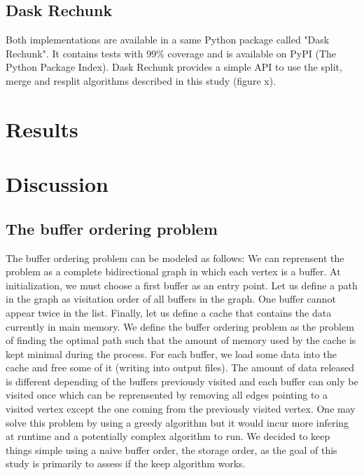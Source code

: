 \documentclass[conference]{IEEEtran}
\begin{document}
\subsection{Dask Rechunk}

Both implementations are available in a same Python package called "Dask Rechunk". It
contains tests with 99\% coverage and is available on PyPI (The Python Package
Index). Dask Rechunk provides a simple API to use the split, merge and resplit
algorithms described in this study (figure x).

\section{Results}

\section{Discussion}

\subsection{The buffer ordering problem}
The buffer ordering problem can be modeled as follows: We can reprensent the
problem as a complete bidirectional graph in which each vertex is a buffer. At
initialization, we must choose a first buffer as an entry point. Let us define
a path in the graph as visitation order of all buffers in the graph. One buffer
cannot appear twice in the list. Finally, let us define a cache that contains
the data currently in main memory. We define the buffer ordering problem as the
problem of finding the optimal path such that the amount of memory used by the
cache is kept minimal during the process. For each buffer, we load some data
into the cache and free some of it (writing into output files). The amount of
data released is different depending of the buffers previously visited and each
buffer can only be visited once which can be reprensented by removing all edges
pointing to a visited vertex except the one coming from the previously visited
vertex. One may solve this problem by using a greedy algorithm but it would
incur more infering at runtime and a potentially complex algorithm to run.
We decided to keep things simple using a naive buffer order, the storage order,
as the goal of this study is primarily to assess if the keep algorithm works.
\end{document}
